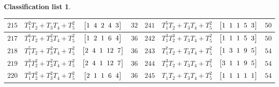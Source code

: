 \documentclass[10pt,a4paper]{amsart}
\theoremstyle{definition}
\newtheorem{class-list}[thm]{Classification list}
\numberwithin{equation}{section}
\begin{document}
\begin{class-list}
\begin{table}[t!]
\begin{tabu}{c|c|c|c||c|c|c|c}
\hline
${215}$&${T_{1}^{2}T_{2}+T_{3}T_{4}+T_{5}^{2}}$
&$\arraycolsep=1mm\begin{bmatrix}{1} & {4} & {2} & {4} & {3}\end{bmatrix}$&${32}$
&${241}$&${T_{1}^{5}T_{2}+T_{3}T_{4}+T_{5}^{2}}$
&$\arraycolsep=1mm\begin{bmatrix}{1} & {1} & {1} & {5} & {3}\end{bmatrix}$&${50}$
\\
\hline
${217}$&${T_{1}^{6}T_{2}+T_{3}^{2}T_{4}+T_{5}^{2}}$
&$\arraycolsep=1mm\begin{bmatrix}{1} & {2} & {1} & {6} & {4}\end{bmatrix}$&${36}$
&${242}$&${T_{1}^{3}T_{2}^{3}+T_{3}T_{4}+T_{5}^{2}}$
&$\arraycolsep=1mm\begin{bmatrix}{1} & {1} & {1} & {5} & {3}\end{bmatrix}$&${50}$
\\
\hline
${218}$&${T_{1}^{5}T_{2}+T_{3}^{2}T_{4}+T_{5}^{2}}$
&$\arraycolsep=1mm\begin{bmatrix}{2} & {4} & {1} & {12} & {7}\end{bmatrix}$&${36}$
&${243}$&${T_{1}^{7}T_{2}+T_{3}T_{4}+T_{5}^{2}}$
&$\arraycolsep=1mm\begin{bmatrix}{1} & {3} & {1} & {9} & {5}\end{bmatrix}$&${54}$
\\
\hline
${219}$&${T_{1}^{3}T_{2}^{2}+T_{3}^{2}T_{4}+T_{5}^{2}}$
&$\arraycolsep=1mm\begin{bmatrix}{2} & {4} & {1} & {12} & {7}\end{bmatrix}$&${36}$
&${244}$&${T_{1}^{3}T_{2}+T_{3}T_{4}+T_{5}^{2}}$
&$\arraycolsep=1mm\begin{bmatrix}{3} & {1} & {1} & {9} & {5}\end{bmatrix}$&${54}$
\\
\hline
${220}$&${T_{1}^{3}T_{2}^{2}+T_{3}^{2}T_{4}+T_{5}^{2}}$
&$\arraycolsep=1mm\begin{bmatrix}{2} & {1} & {1} & {6} & {4}\end{bmatrix}$&${36}$
&${245}$&${T_{1}T_{2}+T_{3}T_{4}+T_{5}^{2}}$
&$\arraycolsep=1mm\begin{bmatrix}{1} & {1} & {1} & {1} & {1}\end{bmatrix}$&${54}$
\\ \hline
\end{tabu}\vspace{-2mm}
\end{table}
\end{class-list}
\end{document}

